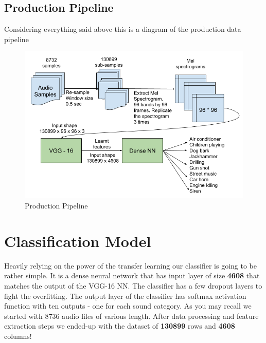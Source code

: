 \hypertarget{production-pipeline}{%
\subsection{Production Pipeline}\label{production-pipeline}}

Considering everything said above this is a diagram of the production
data pipeline

\begin{Schunk}
\begin{figure}[H]

{\centering \includegraphics[width=1\linewidth]{../images/pipeline} 

}

\caption[Production Pipeline]{Production Pipeline}\label{fig:pipeline}
\end{figure}
\end{Schunk}

\hypertarget{classification-model}{%
\section{Classification Model}\label{classification-model}}

Heavily relying on the power of the transfer learning our classifier is
going to be rather simple. It is a dense neural network that has input
layer of size \textbf{4608} that matches the output of the VGG-16 NN.
The classifier has a few dropout layers to fight the overfitting. The
output layer of the classifier has softmax activation function with ten
outputs - one for each sound category. As you may recall we started with
8736 audio files of various length. After data processing and feature
extraction steps we ended-up with the dataset of \textbf{130899} rows
and \textbf{4608} columns!

